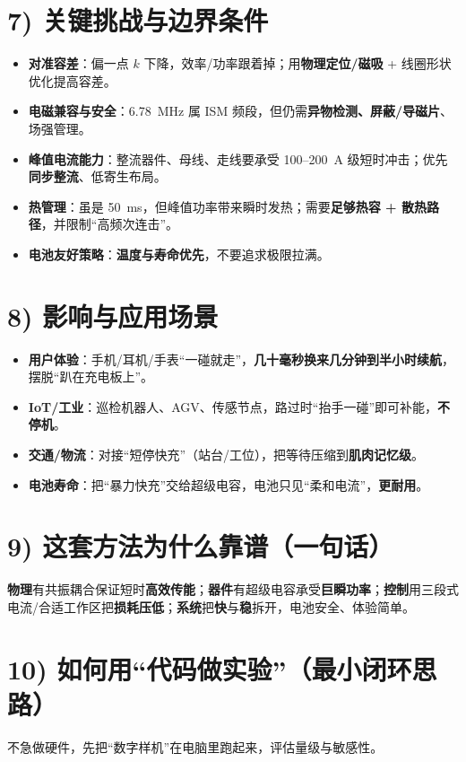 \documentclass[11pt]{ctexart}
\begin{document}
\section{7) 关键挑战与边界条件}
\begin{itemize}
  \item \textbf{对准容差}：偏一点 $k$ 下降，效率/功率跟着掉；用\textbf{物理定位/磁吸} + 线圈形状优化提高容差。
  \item \textbf{电磁兼容与安全}：6.78~MHz 属 ISM 频段，但仍需\textbf{异物检测、屏蔽/导磁片}、场强管理。
  \item \textbf{峰值电流能力}：整流器件、母线、走线要承受 100--200~A 级短时冲击；优先\textbf{同步整流}、低寄生布局。
  \item \textbf{热管理}：虽是 50~ms，但峰值功率带来瞬时发热；需要\textbf{足够热容 + 散热路径}，并限制“高频次连击”。
  \item \textbf{电池友好策略}：\textbf{温度与寿命优先}，不要追求极限拉满。
\end{itemize}

\section{8) 影响与应用场景}
\begin{itemize}
  \item \textbf{用户体验}：手机/耳机/手表“一碰就走”，\textbf{几十毫秒换来几分钟到半小时续航}，摆脱“趴在充电板上”。
  \item \textbf{IoT/工业}：巡检机器人、AGV、传感节点，路过时“抬手一碰”即可补能，\textbf{不停机}。
  \item \textbf{交通/物流}：对接“短停快充”（站台/工位），把等待压缩到\textbf{肌肉记忆级}。
  \item \textbf{电池寿命}：把“暴力快充”交给超级电容，电池只见“柔和电流”，\textbf{更耐用}。
\end{itemize}

\section{9) 这套方法为什么靠谱（一句话）}
\textbf{物理}有共振耦合保证短时\textbf{高效传能}；\textbf{器件}有超级电容承受\textbf{巨瞬功率}；\textbf{控制}用三段式电流/合适工作区把\textbf{损耗压低}；\textbf{系统}把\textbf{快}与\textbf{稳}拆开，电池安全、体验简单。

\section{10) 如何用“代码做实验”（最小闭环思路）}
不急做硬件，先把“数字样机”在电脑里跑起来，评估量级与敏感性。
\end{document}
